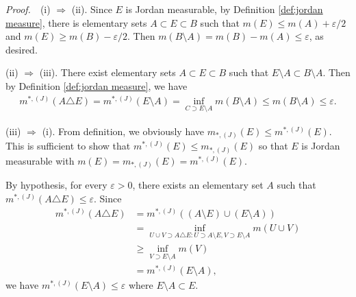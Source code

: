 \documentclass{book}
\theoremstyle{defstyle}
\theoremstyle{thmstyle}
\newcommand{\JIM}{m_{*, (J)}}%
\newcommand{\JOM}{m^{*, (J)}}%
\newcommand{\pff}{\noindent\emph{Proof.}~~}
\begin{document}
\pff (i) $\Rightarrow$ (ii). Since $E$ is Jordan measurable, by Definition \ref{def:jordan measure}, there is elementary sets $A \subset E \subset B$ such that $m(E) \leq m(A) + \varepsilon/2$ and $m(E) \geq m(B) - \varepsilon/2$. Then $m(B \setminus A) = m(B) - m(A) \leq \varepsilon$, as desired.

(ii) $\Rightarrow$ (iii). There exist elementary sets $A \subset E \subset B$ such that $E \setminus A \subset B \setminus A$. Then by Definition \ref{def:jordan measure}, we have
    \begin{align*}
        \JOM(A \triangle E)
        = \JOM(E \setminus A)
        = \inf_{C \supset E \setminus A} m(B \setminus A)
        \leq m(B \setminus A)
        \leq \varepsilon.
    \end{align*}

\begin{comment}
(iii) $\Rightarrow$ (i). Let $\varepsilon > 0$. Let $A$ and $B$ be elementary sets such that $A \subset E \subset B$. Then by Definition \ref{def:jordan measure}
    \begin{align*}
        \JOM(E) - \JIM(E)
        = \inf_{B \supset E}m(B) - \sup_{A \subset E}m(A)
        \leq \inf_{B \supset E}m(B)
    \end{align*}
Since there is an elementary set $A$ such that $\JOM(A \triangle E) \leq \varepsilon$, we have
    \begin{align*}
        \JOM(E) - \JIM(E)
        \leq \inf_{B \setminus A \supset E \setminus A} m(B \setminus A) 
        \leq \varepsilon.
    \end{align*}
Because $\varepsilon$ is arbitrary, we conclude that $\JOM(E) = \JIM(E)$, so that $E$ is Jordan measurable.\qed
\end{comment}

(iii) $\Rightarrow$ (i). From definition, we obviously have $\JIM(E) \leq \JOM(E)$. This is sufficient to show that $\JOM(E) \leq \JIM(E)$ so that $E$ is Jordan measurable with $m(E) = \JIM(E) = \JOM(E)$.

By hypothesis, for every $\varepsilon > 0$, there exists an elementary set $A$ such that $\JOM(A \triangle E) \leq \varepsilon$. Since
    \begin{align*}
        \JOM(A \triangle E)
        &= \JOM((A \setminus E) \cup (E \setminus A))\\
        &= \inf_{U \cup V \supset A \triangle E : U \supset A \setminus E, V \supset E \setminus A}m(U \cup V)\\
        &\geq \inf_{V \supset E \setminus A}m(V)\\
        &= \JOM(E \setminus A),
    \end{align*}
we have $\JOM(E \setminus A) \leq \varepsilon$ where $E \setminus A \subset E$.
\end{document}
